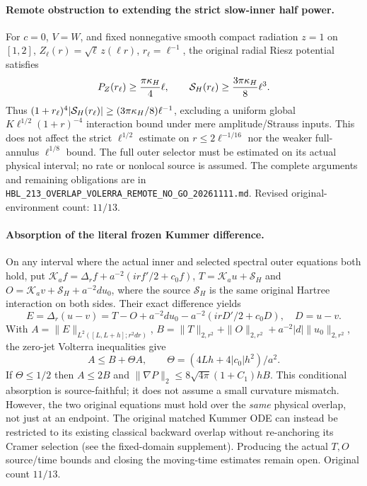 \documentclass[11pt]{amsart}
\begin{document}
\paragraph{Remote obstruction to extending the strict slow-inner half power.}
For $c=0$, $V=W$, and fixed nonnegative smooth compact radiation
$z=1$ on $[1,2]$, $Z_\ell(r)=\sqrt\ell\,z(\ell r)$,
$r_\ell=\ell^{-1}$, the original radial Riesz potential satisfies
\[
 P_Z(r_\ell)\ge\frac{\pi\kappa_H}{4}\ell,\qquad
 {\cal S}_H(r_\ell)\ge\frac{3\pi\kappa_H}{8}\ell^3.
\]
Thus $(1+r_\ell)^4|{\cal S}_H(r_\ell)|
\ge(3\pi\kappa_H/8)\ell^{-1}$, excluding a uniform global
$K\ell^{1/2}(1+r)^{-4}$ interaction bound under mere amplitude/Strauss
inputs. This does not affect the strict $\ell^{1/2}$ estimate on
$r\le2\ell^{-1/16}$ nor the weaker full-annulus $\ell^{1/8}$ bound.
The full outer selector must be estimated on its actual physical
interval; no rate or nonlocal source is assumed.
The complete arguments and remaining obligations are in
\texttt{HBL\_213\_OVERLAP\_VOLERRA\_REMOTE\_NO\_GO\_20261111.md}.
Revised original-environment count: $11/13$.


\paragraph{Absorption of the literal frozen Kummer difference.}
On any interval where the actual inner and selected spectral outer
equations both hold, put
$\mathcal K_af=\Delta_rf+a^{-2}(irf'/2+c_0f)$,
$T=\mathcal K_au+\mathcal S_H$ and
$O=\mathcal K_av+\mathcal S_H+a^{-2}du_0$,
where the source $\mathcal S_H$ is the same original Hartree
interaction on both sides. Their exact difference yields
\[
 E=\Delta_r(u-v)=T-O+a^{-2}du_0
 -a^{-2}(irD'/2+c_0D),\quad D=u-v.
\]
With $A=\|E\|_{L^2([L,L+h];r^2dr)}$,
$B=\|T\|_{2,r^2}+\|O\|_{2,r^2}
 +a^{-2}|d|\|u_0\|_{2,r^2}$, the zero-jet
Volterra inequalities give
\[
 A\le B+\Theta A,\qquad
 \Theta=(4Lh+4|c_0|h^2)/a^2.
\]
If $\Theta\le1/2$ then $A\le2B$ and
$\|\nabla P\|_2\le8\sqrt{4\pi}(1+C_1)hB$.
This conditional absorption is source-faithful; it does not
assume a small curvature mismatch. However, the two original
equations must hold over the \emph{same} physical overlap,
not just at an endpoint. The original matched Kummer ODE can instead be restricted to its
existing classical backward overlap without re-anchoring its Cramer
selection (see the fixed-domain supplement). Producing the actual
$T,O$ source/time bounds and closing the moving-time estimates remain open.
Original count $11/13$.
\end{document}
